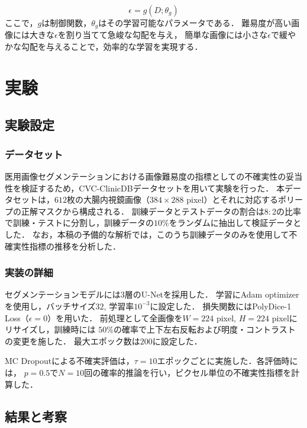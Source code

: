 \documentclass[10pt, a4paper, twocolumn]{jarticle}
\begin{document}
\begin{equation}
  \epsilon = g(D; \theta_g)
\end{equation}
ここで，$g$は制御関数，$\theta_g$はその学習可能なパラメータである．
難易度が高い画像には大きな$\epsilon$を割り当てて急峻な勾配を与え，
簡単な画像には小さな$\epsilon$で緩やかな勾配を与えることで，効率的な学習を実現する．

\section{実験}
\subsection{実験設定}
\subsubsection{データセット}
医用画像セグメンテーションにおける画像難易度の指標としての不確実性の妥当性を検証するため，CVC-ClinicDB\cite{BERNAL201599}データセットを用いて実験を行った．
本データセットは，$612$枚の大腸内視鏡画像（$384 \times 288$ pixel）とそれに対応するポリープの正解マスクから構成される．
訓練データとテストデータの割合は$8:2$の比率で訓練・テストに分割し，訓練データの$10 \%$をランダムに抽出して検証データとした．
なお，本稿の予備的な解析では，このうち訓練データのみを使用して不確実性指標の推移を分析した．

\subsubsection{実装の詳細}
セグメンテーションモデルには$3$層のU-Net\cite{ronneberger2015u}を採用した．
学習にAdam optimizer\cite{kingma2014adam}を使用し，バッチサイズ$32$, 学習率$10 ^ {-3}$に設定した．
損失関数にはPolyDice-1 Loss（$\epsilon = 0$）を用いた．
前処理として全画像を$W = 224$ pixel, $H = 224$ pixelにリサイズし，訓練時には
$50\%$の確率で上下左右反転および明度・コントラストの変更を施した．
最大エポック数は$200$に設定した．

MC Dropoutによる不確実評価は，$\tau=10$エポックごとに実施した．各評価時には，
$p = 0.5$で$N = 10$回の確率的推論を行い，ピクセル単位の不確実性指標を計算した．

\subsection{結果と考察}
\end{document}
